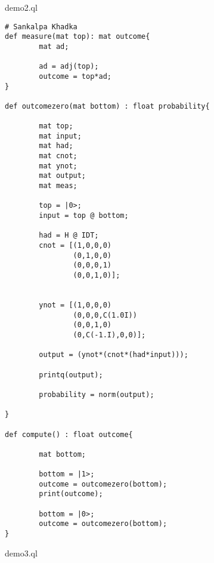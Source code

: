 demo2.ql
\begin{lstlisting}
# Sankalpa Khadka
def measure(mat top): mat outcome{
        mat ad;
        
        ad = adj(top);
        outcome = top*ad;
}

def outcomezero(mat bottom) : float probability{
        
        mat top;
        mat input;
        mat had;
        mat cnot;
        mat ynot;
        mat output;
        mat meas;
        
        top = |0>;
        input = top @ bottom;
        
        had = H @ IDT;
        cnot = [(1,0,0,0)
                (0,1,0,0)
                (0,0,0,1)
                (0,0,1,0)];
      
        
        ynot = [(1,0,0,0)
                (0,0,0,C(1.0I))
                (0,0,1,0)
                (0,C(-1.I),0,0)];
    
        output = (ynot*(cnot*(had*input)));
        
        printq(output);
        
        probability = norm(output);
   
}

def compute() : float outcome{
        
        mat bottom;
        
        bottom = |1>;
        outcome = outcomezero(bottom);
        print(outcome);
        
        bottom = |0>;
        outcome = outcomezero(bottom);
}

\end{lstlisting}
demo3.ql
